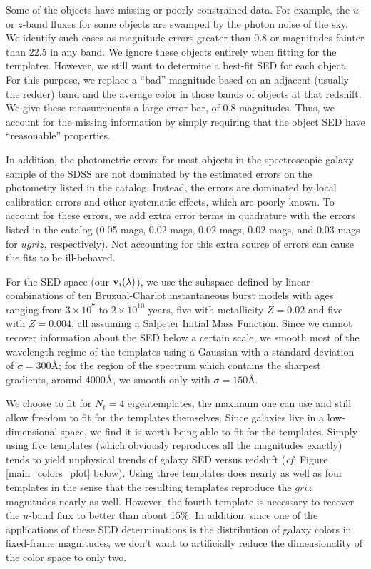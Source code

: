 \documentclass[10pt,preprint]{aastex}
\newcommand{\vv}[1]{{\bf #1}}
\begin{document}
Some of the objects have missing or poorly constrained data. For
example, the $u$- or $z$-band fluxes for some objects are swamped by
the photon noise of the sky. We identify such cases as magnitude
errors greater than 0.8 or magnitudes fainter than 22.5 in any
band. We ignore these objects entirely when fitting for the
templates. However, we still want to determine a best-fit SED for each
object. For this purpose, we replace a ``bad'' magnitude based on an
adjacent (usually the redder) band and the average color in those
bands of objects at that redshift. We give these measurements a large
error bar, of 0.8 magnitudes. Thus, we account for the missing
information by simply requiring that the object SED have
``reasonable'' properties.

In addition, the photometric errors for most objects in the
spectroscopic galaxy sample of the SDSS are not dominated by the
estimated errors on the photometry listed in the catalog. Instead, the
errors are dominated by local calibration errors and other systematic
effects, which are poorly known. To account for these errors, we add
extra error terms in quadrature with the errors listed in the catalog
(0.05 mags, 0.02 mags, 0.02 mags, 0.02 mags, and 0.03 mags for
$ugriz$, respectively). Not accounting for this extra source of errors
can cause the fits to be ill-behaved.

For the SED space (our $\vv{v}_i(\lambda)$), we use the subspace
defined by linear combinations of ten Bruzual-Charlot instantaneous
burst models with ages ranging from $3 \times 10^7$ to $2\times
10^{10}$ years, five with metallicity $Z=0.02$ and five with
$Z=0.004$, all assuming a Salpeter Initial Mass Function. Since we
cannot recover information about the SED below a certain scale, we
smooth most of the wavelength regime of the templates using a Gaussian
with a standard deviation of $\sigma = 300$\AA; for the region of the
spectrum which contains the sharpest gradients, around 4000\AA, we
smooth only with $\sigma = 150$\AA. 

We choose to fit for $N_t = 4$ eigentemplates, the maximum one can use
and still allow freedom to fit for the templates themselves. Since
galaxies live in a low-dimensional space, we find it is worth being
able to fit for the templates. Simply using five templates (which
obviously reproduces all the magnitudes exactly) tends to yield
unphysical trends of galaxy SED versus redshift ({\it cf.}  Figure
\ref{main_colors_plot} below). Using three templates does nearly as well as
four templates in the sense that the resulting templates reproduce the
$griz$ magnitudes nearly as well. However, the fourth template is
necessary to recover the $u$-band flux to better than about 15\%. In
addition, since one of the applications of these SED determinations is
the distribution of galaxy colors in fixed-frame magnitudes, we don't
want to artificially reduce the dimensionality of the color space to
only two.
\end{document}
